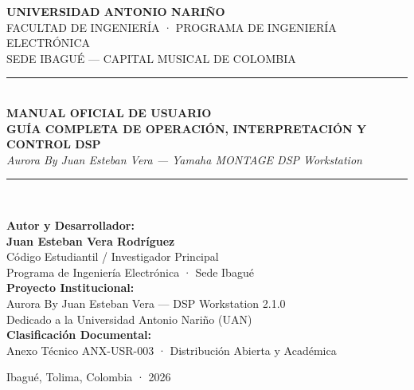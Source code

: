 \documentclass[11pt,a4paper]{article}
\begin{document}
\begin{titlepage}
    \centering
    \vspace*{0.5cm}
    
    {\scshape\LARGE \textbf{UNIVERSIDAD ANTONIO NARIÑO}}\\[0.3cm]
    {\scshape\large FACULTAD DE INGENIERÍA · PROGRAMA DE INGENIERÍA ELECTRÓNICA}\\[0.15cm]
    {\small SEDE IBAGUÉ — CAPITAL MUSICAL DE COLOMBIA}\\[1.5cm]
    
    \rule{\linewidth}{1.8pt}\\[0.4cm]
    {\Huge \bfseries \textcolor{uanblue}{MANUAL OFICIAL DE USUARIO}}\\[0.3cm]
    {\Large \bfseries GUÍA COMPLETA DE OPERACIÓN, INTERPRETACIÓN Y CONTROL DSP}\\[0.25cm]
    {\large \itshape Aurora By Juan Esteban Vera — Yamaha MONTAGE DSP Workstation}\\[0.4cm]
    \rule{\linewidth}{1.8pt}\\[2.0cm]
    
    \begin{minipage}{0.85\textwidth}
        \large
        \textbf{Autor y Desarrollador:}\\[0.15cm]
        \textbf{Juan Esteban Vera Rodríguez}\\
        Código Estudiantil / Investigador Principal\\
        Programa de Ingeniería Electrónica · Sede Ibagué\\[0.8cm]
        
        \textbf{Proyecto Institucional:}\\
        Aurora By Juan Esteban Vera — DSP Workstation 2.1.0\\
        Dedicado a la Universidad Antonio Nariño (UAN)\\[0.8cm]
        
        \textbf{Clasificación Documental:}\\
        Anexo Técnico ANX-USR-003 · Distribución Abierta y Académica
    \end{minipage}
    
    \vfill
    {\large Ibagué, Tolima, Colombia · 2026}
\end{titlepage}

\newpage
\tableofcontents
\newpage
\end{document}
